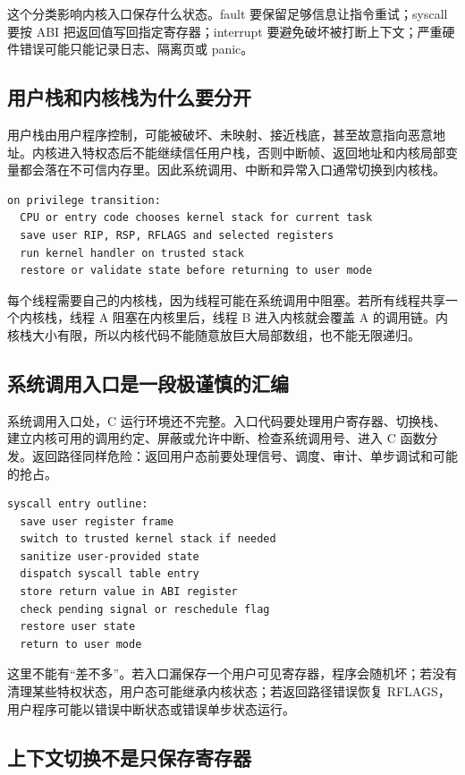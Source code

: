 这个分类影响内核入口保存什么状态。fault 要保留足够信息让指令重试；syscall 要按 ABI 把返回值写回指定寄存器；interrupt 要避免破坏被打断上下文；严重硬件错误可能只能记录日志、隔离页或 panic。

\subsection{用户栈和内核栈为什么要分开}

用户栈由用户程序控制，可能被破坏、未映射、接近栈底，甚至故意指向恶意地址。内核进入特权态后不能继续信任用户栈，否则中断帧、返回地址和内核局部变量都会落在不可信内存里。因此系统调用、中断和异常入口通常切换到内核栈。

\begin{lstlisting}
on privilege transition:
  CPU or entry code chooses kernel stack for current task
  save user RIP, RSP, RFLAGS and selected registers
  run kernel handler on trusted stack
  restore or validate state before returning to user mode
\end{lstlisting}

每个线程需要自己的内核栈，因为线程可能在系统调用中阻塞。若所有线程共享一个内核栈，线程 A 阻塞在内核里后，线程 B 进入内核就会覆盖 A 的调用链。内核栈大小有限，所以内核代码不能随意放巨大局部数组，也不能无限递归。

\subsection{系统调用入口是一段极谨慎的汇编}

系统调用入口处，C 运行环境还不完整。入口代码要处理用户寄存器、切换栈、建立内核可用的调用约定、屏蔽或允许中断、检查系统调用号、进入 C 函数分发。返回路径同样危险：返回用户态前要处理信号、调度、审计、单步调试和可能的抢占。

\begin{lstlisting}
syscall entry outline:
  save user register frame
  switch to trusted kernel stack if needed
  sanitize user-provided state
  dispatch syscall table entry
  store return value in ABI register
  check pending signal or reschedule flag
  restore user state
  return to user mode
\end{lstlisting}

这里不能有“差不多”。若入口漏保存一个用户可见寄存器，程序会随机坏；若没有清理某些特权状态，用户态可能继承内核状态；若返回路径错误恢复 RFLAGS，用户程序可能以错误中断状态或错误单步状态运行。

\subsection{上下文切换不是只保存寄存器}

